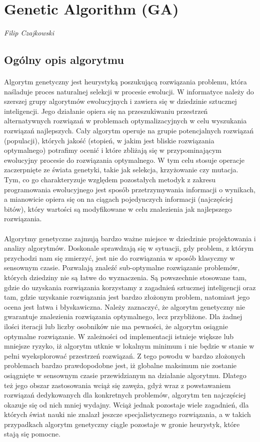 \section{Genetic Algorithm (GA)}
\textit{Filip Czajkowski}
\subsection{Ogólny opis algorytmu}
\label{genetic_description}
\paragraph{}Algorytm genetyczny jest heurystyką poszukującą rozwiązania problemu, która naśladuje proces naturalnej selekcji w procesie ewolucji. W informatyce należy do szerszej grupy algorytmów ewolucyjnych i zawiera się w dziedzinie sztucznej inteligencji. Jego działanie opiera się na przeszukiwaniu przestrzeń alternatywnych rozwiązań w problemach optymalizacyjnych w celu wyszukania rozwiązań najlepszych. Cały algorytm operuje na grupie potencjalnych rozwiązań (populacji), których jakość (stopień, w jakim jest bliskie rozwiązania optymalnego) potrafimy ocenić i które zbliżają się w przypominającym ewolucyjny procesie do rozwiązania optymalnego. W tym celu stosuje operacje zaczerpnięte ze świata genetyki, takie jak selekcja, krzyżowanie czy mutacja. Tym, co go charakteryzuje względem pozostałych metodyk z zakresu programowania ewolucyjnego jest sposób przetrzymywania informacji o wynikach, a mianowicie opiera się on na ciągach pojedynczych informacji (najczęściej bitów), który wartości są modyfikowane w celu znalezienia jak najlepszego rozwiązania.
\paragraph{}Algorytmy genetyczne zajmują bardzo ważne miejsce w dziedzinie projektowania i analizy algorytmów. Doskonale sprawdzają się w sytuacji, gdy problem, z którym przychodzi nam się zmierzyć, jest nie do rozwiązania w sposób klasyczny w sensownym czasie. Pozwalają znaleźć sub-optymalne rozwiązanie problemów, których dziedziny nie są łatwe do wyznaczenia. Są powszechnie stosowane tam, gdzie do uzyskania rozwiązania korzystamy z zagadnień sztucznej inteligencji oraz tam, gdzie uzyskanie rozwiązania jest bardzo złożonym problem, natomiast jego ocena jest łatwa i błyskawiczna. Należy zaznaczyć, że algorytm genetyczny nie gwarantuje znalezienia rozwiązania optymalnego, lecz przybliżone. Dla żadnej ilości iteracji lub liczby osobników nie ma pewności, że algorytm osiągnie optymalne rozwiązanie. W zależności od implementacji istnieje większe lub mniejsze ryzyko, iż algorytm utknie w lokalnym minimum i nie będzie w stanie w pełni wyeksplorować przestrzeń rozwiązań. Z tego powodu w bardzo złożonych problemach bardzo prawdopodobne jest, iż globalne maksimum nie zostanie osiągnięte w sensownym czasie przewidzianym na działanie algorytmu. Dlatego też jego obszar zastosowania wciąż się zawęża, gdyż wraz z powstawaniem rozwiązań dedykowanych dla konkretnych problemów, algorytm ten najczęściej okazuje się od nich mniej wydajny. Wciąż jednak pozostaje wiele zagadnień, dla których świat nauki nie znalazł jeszcze specjalistycznego rozwiązania, a w takich przypadkach algorytm genetyczny ciągle pozostaje w gronie heurystyk, które stają się pomocne.

